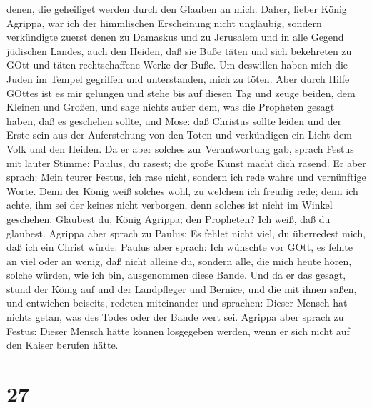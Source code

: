 denen, die geheiliget werden durch den Glauben an mich. 
Daher, lieber König Agrippa, war ich der himmlischen Erscheinung nicht
ungläubig,  sondern verkündigte zuerst denen zu Damaskus
und zu Jerusalem und in alle Gegend jüdischen Landes, auch den Heiden,
daß sie Buße täten und sich bekehreten zu GOtt und täten rechtschaffene
Werke der Buße.  Um deswillen haben mich die Juden im
Tempel gegriffen und unterstanden, mich zu töten.  Aber
durch Hilfe GOttes ist es mir gelungen und stehe bis auf diesen Tag und
zeuge beiden, dem Kleinen und Großen, und sage nichts außer dem, was die
Propheten gesagt haben, daß es geschehen sollte, und Mose: 
daß Christus sollte leiden und der Erste sein aus der Auferstehung von
den Toten und verkündigen ein Licht dem Volk und den Heiden.
 Da er aber solches zur Verantwortung gab, sprach Festus
mit lauter Stimme: Paulus, du rasest; die große Kunst macht dich rasend.
 Er aber sprach: Mein teurer Festus, ich rase nicht,
sondern ich rede wahre und vernünftige Worte.  Denn der
König weiß solches wohl, zu welchem ich freudig rede; denn ich achte,
ihm sei der keines nicht verborgen, denn solches ist nicht im Winkel
geschehen.  Glaubest du, König Agrippa; den Propheten? Ich
weiß, daß du glaubest.  Agrippa aber sprach zu Paulus: Es
fehlet nicht viel, du überredest mich, daß ich ein Christ würde.
 Paulus aber sprach: Ich wünschte vor GOtt, es fehlte an
viel oder an wenig, daß nicht alleine du, sondern alle, die mich heute
hören, solche würden, wie ich bin, ausgenommen diese Bande.
 Und da er das gesagt, stund der König auf und der
Landpfleger und Bernice, und die mit ihnen saßen,  und
entwichen beiseits, redeten miteinander und sprachen: Dieser Mensch hat
nichts getan, was des Todes oder der Bande wert sei. 
Agrippa aber sprach zu Festus: Dieser Mensch hätte können losgegeben
werden, wenn er sich nicht auf den Kaiser berufen hätte.

\hypertarget{section-26}{%
\section{27}\label{section-26}}

